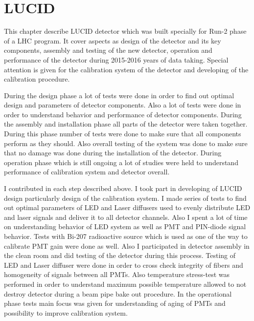 \chapter{LUCID}
\label{chap:LUCID}


This chapter describe LUCID detector which was built specially for Run-2 phase of a LHC program.
It cover aspects as design of the detector and its key components, assembly and testing of the new detector, 
operation and performance of the detector during 2015-2016 years of data taking.
Special attention is given for the calibration system of the detector and developing of the calibration procedure.

During the design phase a lot of tests were done in order to find out optimal design and parameters of detector components.
Also a lot of tests were done in order to understand behavior and performance of detector components.
During the assembly and installation phase all parts of the detector were taken together. During this phase number of tests were done
to make sure that all components perform as they should.
Also overall testing of the system was done to make sure that no damage was done during the installation of the detector.
During operation phase which is still ongoing a lot of studies were held to understand performance of calibration system and detector overall.

I contributed in each step described above. I took part in developing of LUCID design particularly design of the calibration system. 
I made series of tests to find out optimal parameters of LED and Laser diffusers used to evenly distribute LED and laser signals and deliver it to all detector 
channels. 
Also I spent a lot of time on understanding behavior of LED system as well as PMT and PIN-diode signal behavior.
Tests with Bi-207 radioactive source which is used as one of the way to calibrate PMT gain were done as well.
Also I participated in detector assembly in the clean room and did testing of the detector during this process.
Testing of LED and Laser diffuser were done in order to cross check integrity of fibers and homogeneity of signals between all PMTs.
Also temperature stress-test was performed in order to understand maximum possible temperature allowed to not destroy detector during a beam pipe bake out 
procedure.
In the operational phase tests main focus was given for understanding of aging of PMTs and possibility to improve calibration system.

